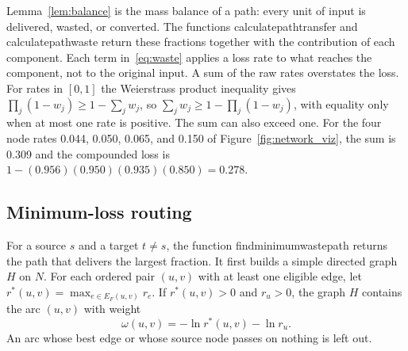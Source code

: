 \documentclass[12pt]{article}
\newcommand{\code}[1]{{\ttfamily\def\_{\textunderscore\allowbreak}#1}}
\theoremstyle{plain}
\theoremstyle{definition}
\begin{document}
Lemma~\ref{lem:balance} is the mass balance of a path: every unit of input is delivered, wasted, or converted. The functions \code{calculate\_path\_transfer} and \code{calculate\_path\_waste} return these fractions together with the contribution of each component. Each term in~\eqref{eq:waste} applies a loss rate to what reaches the component, not to the original input. A sum of the raw rates overstates the loss. For rates in $[0,1]$ the Weierstrass product inequality gives $\prod_j(1-w_j)\geq 1-\sum_j w_j$, so $\sum_j w_j\geq 1-\prod_j(1-w_j)$, with equality only when at most one rate is positive. The sum can also exceed one. For the four node rates 0.044, 0.050, 0.065, and 0.150 of Figure~\ref{fig:network_viz}, the sum is 0.309 and the compounded loss is $1-(0.956)(0.950)(0.935)(0.850)=0.278$.

\subsection{Minimum-loss routing}\label{sec:routing}

For a source $s$ and a target $t\neq s$, the function \code{find\_minimum\_waste\_path} returns the path that delivers the largest fraction. It first builds a simple directed graph $H$ on $N$. For each ordered pair $(u,v)$ with at least one eligible edge, let $r^*(u,v)=\max_{e\in E_F(u,v)} r_e$. If $r^*(u,v)>0$ and $r_u>0$, the graph $H$ contains the arc $(u,v)$ with weight
\begin{equation}\label{eq:weight}
    \omega(u,v)=-\ln r^*(u,v)-\ln r_u .
\end{equation}
An arc whose best edge or whose source node passes on nothing is left out.
\end{document}
